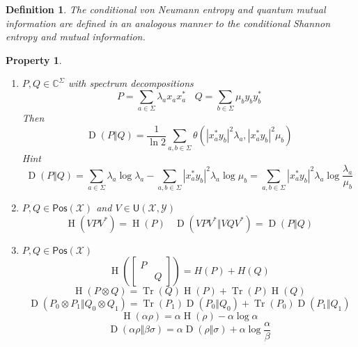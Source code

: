 \documentclass[aps,pra,onecolumn,notitlepage,superscriptaddress]{revtex4-1}
\newcommand{\C}{\mathbb{C}}
\newcommand{\spc}[1]{\mathcal{#1}}
\newcommand{\Pos}{\mathsf{Pos}}
\newcommand{\U}{\mathsf{U}}
\newcommand{\Tr}{\operatorname{Tr}}
\newcommand{\op}[1]{\operatorname{#1}}
\newtheorem{defi}{Definition}
\newtheorem{proper}{Property}
\begin{document}
    \begin{defi}
        The conditional von Neumann entropy and quantum mutual information are defined in an analogous manner to the conditional Shannon entropy and mutual information.
    \end{defi}

    \begin{proper}
        \begin{enumerate}
            \item $P, Q \in \C^\Sigma$ with spectrum decompositions
            \begin{equation}
                P = \sum_{a \in \Sigma} \lambda_{a} x_ax_a^* \ \ \ \ 
                Q = \sum_{b \in \Sigma} \mu_{b} y_by_b^*
            \end{equation}
            Then
            \begin{equation}
                \boxed{
                    \op D(P \Vert Q) = \frac{1}{\ln 2} \sum_{a,b \in \Sigma} \theta( |x_a^*y_b|^2 \lambda_a, |x_a^*y_b|^2 \mu_b )
                }
            \end{equation}
            Hint
            \begin{equation}
                \op D(P \Vert Q) = \sum_{a \in \Sigma} \lambda_a \log \lambda_a - \sum_{a,b \in \Sigma} |x_a^*y_b|^2 \lambda_a \log \mu_b = \sum_{a,b \in \Sigma} |x_a^*y_b|^2 \lambda_a \log \frac{\lambda_a}{\mu_b}
            \end{equation}
            \item $P,Q \in \Pos(\spc X)$ and $V \in \U(\spc X, \spc Y)$
            \begin{equation}
                \op H(VPV^*) = \op H(P) \ \ \ \ \op D(VPV^* \Vert VQV^*) = \op D(P \Vert Q)
            \end{equation}
            \item $P, Q \in \Pos(\spc X)$
            \begin{equation}
                \op H \left( \begin{bmatrix}
                    P &  \\
                     & Q
                \end{bmatrix} \right) = H(P) + H(Q)
            \end{equation}
            \begin{equation}
                \op H(P \otimes Q) = \Tr(Q)\op H(P) + \Tr(P)\op H(Q)
            \end{equation}
            \begin{equation}
                \op D(P_0 \otimes P_1 \Vert Q_0 \otimes Q_1) = \Tr(P_1)\op D(P_0 \Vert Q_0) + \Tr(P_0) \op D(P_1 \Vert Q_1)
            \end{equation}
            \begin{equation}
                \op H(\alpha \rho) = \alpha\op H(\rho) - \alpha \log \alpha
            \end{equation}
            \begin{equation}
                \op D(\alpha \rho \Vert \beta \sigma) = \alpha \op D(\rho \Vert \sigma) + \alpha \log \frac{\alpha}{\beta}
            \end{equation}


\end{enumerate}
\end{proper}
\end{document}

